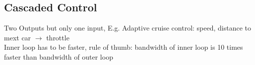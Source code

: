 \subsection{Cascaded Control}
    Two Outputs but only one input, E.g. Adaptive cruise control: speed, distance to mext car $\rightarrow$ throttle\\
    Inner loop has to be faster, rule of thumb: bandwidth of inner loop is 10 times faster than bandwidth of outer loop